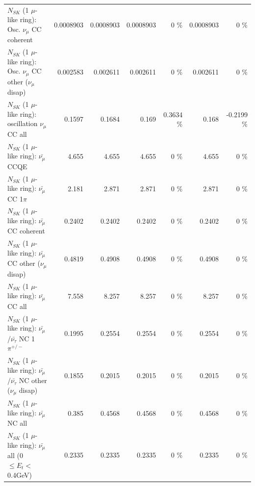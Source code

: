\begin{table}
\begin{tabular}{| l | r | r | r  r | r  r |}
                        $N_{SK}$ (1 $\mu$-like ring): Osc. $\nu_\mu$ CC coherent &       0.0008903 &       0.0008903 &       0.0008903 &        0 \%  &       0.0008903 &        0 \%  \\ 
         $N_{SK}$ (1 $\mu$-like ring): Osc. $\nu_\mu$ CC other ($\nu_\mu$ disap) &        0.002583 &        0.002611 &        0.002611 &        0 \%  &        0.002611 &        0 \%  \\ 
                      $N_{SK}$ (1 $\mu$-like ring): oscillation $\nu_\mu$ CC all &          0.1597 &          0.1684 &           0.169 &   0.3634 \%  &           0.168 &  -0.2199 \%  \\ 
\hline
\hline
                              $N_{SK}$ (1 $\mu$-like ring): $\bar{\nu_\mu}$ CCQE &           4.655 &           4.655 &           4.655 &        0 \%  &           4.655 &        0 \%  \\ 
                         $N_{SK}$ (1 $\mu$-like ring): $\bar{\nu_\mu}$ CC 1$\pi$ &           2.181 &           2.871 &           2.871 &        0 \%  &           2.871 &        0 \%  \\ 
                       $N_{SK}$ (1 $\mu$-like ring): $\bar{\nu_\mu}$ CC coherent &          0.2402 &          0.2402 &          0.2402 &        0 \%  &          0.2402 &        0 \%  \\ 
        $N_{SK}$ (1 $\mu$-like ring): $\bar{\nu_\mu}$ CC other ($\nu_\mu$ disap) &          0.4819 &          0.4908 &          0.4908 &        0 \%  &          0.4908 &        0 \%  \\ 
                          $N_{SK}$ (1 $\mu$-like ring): $\bar{\nu_{\mu}}$ CC all &           7.558 &           8.257 &           8.257 &        0 \%  &           8.257 &        0 \%  \\ 
\hline
  $N_{SK}$ (1 $\mu$-like ring): $\bar{\nu_\mu}$/$\bar{\nu_\tau}$ NC 1$\pi^{+/-}$ &          0.1995 &          0.2554 &          0.2554 &        0 \%  &          0.2554 &        0 \%  \\ 
$N_{SK}$ (1 $\mu$-like ring): $\bar{\nu_\mu}$/$\bar{\nu_\tau}$ NC other ($\nu_\mu$ disap) &          0.1855 &          0.2015 &          0.2015 &        0 \%  &          0.2015 &        0 \%  \\ 
                          $N_{SK}$ (1 $\mu$-like ring): $\bar{\nu_{\mu}}$ NC all &           0.385 &          0.4568 &          0.4568 &        0 \%  &          0.4568 &        0 \%  \\ 
\hline
   $N_{SK}$ (1 $\mu$-like ring): $\bar{\nu_{\mu}}$ all (0 $\leq E_{t} <$ 0.4GeV) &          0.2335 &          0.2335 &          0.2335 &        0 \%  &          0.2335 &        0 \%  \\ 

\end{tabular}
\end{table}

